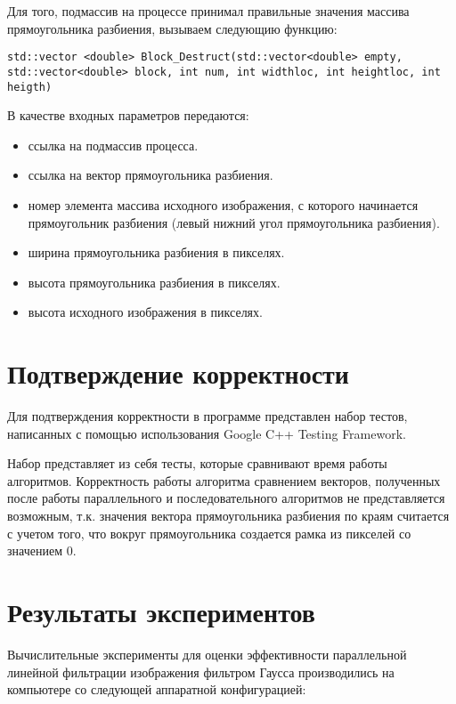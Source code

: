 \documentclass{report}
\begin{document}
\par Для того, подмассив на процессе принимал правильные значения массива прямоугольника разбиения, вызываем следующию функцию:
\begin{lstlisting}
std::vector <double> Block_Destruct(std::vector<double> empty, std::vector<double> block, int num, int widthloc, int heightloc, int heigth)
\end{lstlisting}
\par В качестве входных параметров передаются:
\begin{itemize}
\item ссылка на подмассив процесса.
\item ссылка на вектор прямоугольника разбиения.
\item номер элемента массива исходного изображения, с которого начинается прямоугольник разбиения (левый нижний угол прямоугольника разбиения).
\item ширина прямоугольника разбиения в пикселях.
\item высота прямоугольника разбиения в пикселях.
\item высота исходного изображения в пикселях.
\end{itemize}
\newpage

\section*{Подтверждение корректности}
Для подтверждения корректности в программе представлен набор тестов, написанных с помощью использования Google C++ Testing Framework.
\par Набор представляет из себя тесты, которые сравнивают время работы алгоритмов. Корректность работы алгоритма сравнением векторов, полученных после работы параллельного и последовательного алгоритмов не представляется возможным, т.к. значения вектора прямоугольника разбиения по краям считается с учетом того, что вокруг прямоугольника создается рамка из пикселей со значением 0.
\newpage

\section*{Результаты экспериментов}
Вычислительные эксперименты для оценки эффективности параллельной линейной фильтрации изображения фильтром Гаусса производились на компьютере со следующей аппаратной конфигурацией:
\end{document}
